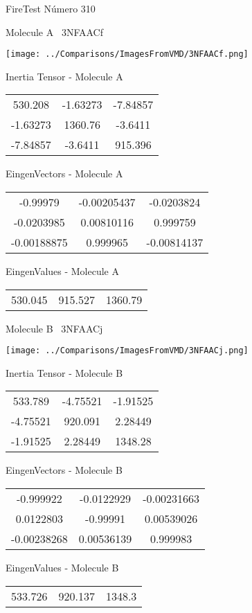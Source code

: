 \vtab[-3cm]
\begin{center}
{\large FireTest \tab Número 310}
\end{center}
\begin{multicols}{2}
\begin{center}

Molecule A \
3NFAACf

\texttt{[image: ../Comparisons/ImagesFromVMD/3NFAACf.png]}

Inertia Tensor - Molecule A \\
\begin{tabular}{|c c c|}
530.208	 & 	-1.63273	 & 	-7.84857	 \\
-1.63273	 & 	1360.76	 & 	-3.6411	 \\
-7.84857	 & 	-3.6411	 & 	915.396
\end{tabular}

\vtab
 EingenVectors - Molecule A     \\
\begin{tabular}{|c c c|}
-0.99979	 & 	-0.00205437	 & 	-0.0203824	 \\
-0.0203985	 & 	0.00810116	 & 	0.999759	 \\
-0.00188875	 & 	0.999965	 & 	-0.00814137
\end{tabular}

\vtab
 EingenValues - Molecule A     \\
\begin{tabular}{|c c c|}
530.045	 & 	915.527	 & 	1360.79	 \\
\end{tabular}
\columnbreak

Molecule B \
3NFAACj

\texttt{[image: ../Comparisons/ImagesFromVMD/3NFAACj.png]}

Inertia Tensor - Molecule B \\
\begin{tabular}{|c c c|}
533.789	 & 	-4.75521	 & 	-1.91525	 \\
-4.75521	 & 	920.091	 & 	2.28449	 \\
-1.91525	 & 	2.28449	 & 	1348.28
\end{tabular}

\vtab
 EingenVectors - Molecule B     \\
\begin{tabular}{|c c c|}
-0.999922	 & 	-0.0122929	 & 	-0.00231663	 \\
0.0122803	 & 	-0.99991	 & 	0.00539026	 \\
-0.00238268	 & 	0.00536139	 & 	0.999983
\end{tabular}

\vtab
 EingenValues - Molecule B     \\
\begin{tabular}{|c c c|}
533.726	 & 	920.137	 & 	1348.3	 \\
\end{tabular}

\end{center}
\end{multicols}

